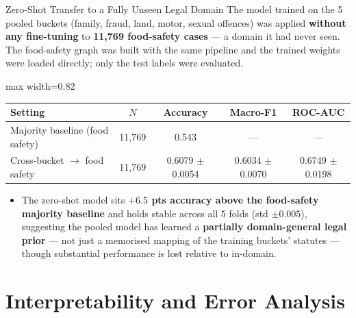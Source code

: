 \documentclass[aspectratio=169,11pt]{beamer}
\newenvironment{tightitemize}{
  \begin{itemize}
    \setlength{\itemsep}{2pt}
    \setlength{\parskip}{0pt}
}{\end{itemize}}
\newcommand{\highlight}[1]{\textcolor{ThesisBlue}{\textbf{#1}}}
\begin{document}
\begin{frame}{Zero-Shot Transfer to a Fully Unseen Legal Domain}
  \scriptsize
  The model trained on the 5 pooled buckets (family, fraud, land, motor, sexual offences) was applied \highlight{without any fine-tuning} to \highlight{11{,}769 food-safety cases} --- a domain it had never seen. The food-safety graph was built with the same pipeline and the trained weights were loaded directly; only the test labels were evaluated.

  \vspace{0.8em}
  \centering
  \begin{adjustbox}{max width=0.82\textwidth}
    \begin{tabular}{lcccc}
      \toprule
      \textbf{Setting} & \textbf{$N$} & \textbf{Accuracy} & \textbf{Macro-F1} & \textbf{ROC-AUC} \\
      \midrule
      Majority baseline (food safety)       & 11{,}769 & 0.543              & ---                    & --- \\
      Cross-bucket $\rightarrow$ food safety & 11{,}769 & 0.6079 $\pm$ 0.0054 & 0.6034 $\pm$ 0.0070 & 0.6749 $\pm$ 0.0198 \\
      \bottomrule
    \end{tabular}
  \end{adjustbox}

  \vspace{0.8em}
  \raggedright
  \begin{tightitemize}
    \item The zero-shot model sits \highlight{$+6.5$ pts accuracy above the food-safety majority baseline} and holds stable across all 5 folds (std $\pm 0.005$), suggesting the pooled model has learned a \highlight{partially domain-general legal prior} --- not just a memorised mapping of the training buckets' statutes --- though substantial performance is lost relative to in-domain.
  \end{tightitemize}
\end{frame}


\section{Interpretability and Error Analysis}
\end{document}
